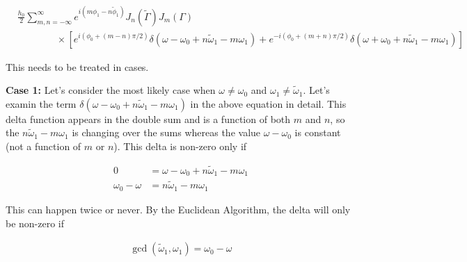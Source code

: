 \documentclass[onecolumn, groupedaddress, 10pt]{revtex4-1}
\begin{document}
\begin{align}
&\frac{h_0}{2} \sum_{m,n=-\infty}^{\infty} e^{i(m\phi_1-n\widetilde{\phi}_1)} J_n(\widetilde{\Gamma}) J_m (\Gamma)				\nonumber \\
&\qquad \qquad
\times \left[
e^{i(\phi_0 + (m-n)\pi/2)} \delta(\omega - \omega_0 + n\widetilde{\omega}_1 - m\omega_1)
+ e^{-i(\phi_0 + (m+n)\pi/2)} \delta(\omega + \omega_0 + n\widetilde{\omega}_1 - m\omega_1)
\right]
\end{align}




This needs to be treated in cases.  

\textbf{Case 1:}  Let's consider the most likely case when $\omega \neq \omega_0$ and $\omega_1 \neq \widetilde{\omega}_1$.  Let's examin the term $\delta(\omega - \omega_0 + n\widetilde{\omega}_1 - m\omega_1)$ in the above equation in detail.  This delta function appears in the double sum and is a function of both $m$ and $n$, so the $n\widetilde{\omega}_1 - m\omega_1$ is changing over the sums whereas the value $\omega - \omega_0$ is constant (not a function of $m$ or $n$).  This delta is non-zero only if

\begin{align}
                0 &= \omega - \omega_0 + n\widetilde{\omega}_1 - m\omega_1		\\
\omega_0 - \omega &= n\widetilde{\omega}_1 - m\omega_1
\end{align}

This can happen twice or never.  By the Euclidean Algorithm, the delta will only be non-zero if

\begin{align}
\gcd \left( \widetilde{\omega}_1, \omega_1 \right) = \omega_0 - \omega
\end{align}
\end{document}

